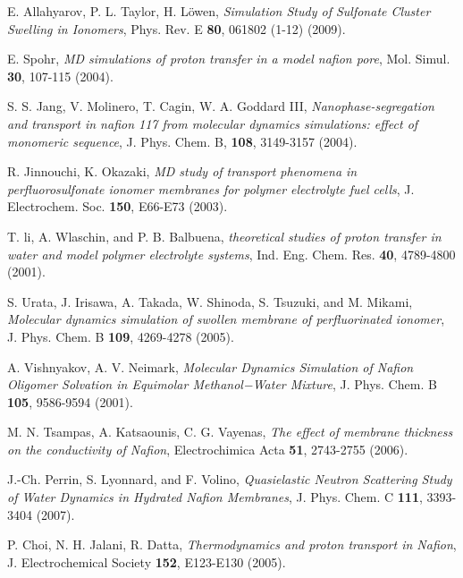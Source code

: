 \documentclass[3p,english,preprint]{elsarticle}
\newcommand{\need}[1]{\textcolor{black}{#1}}
\begin{document}
\begin{thebibliography}{00}
E. Allahyarov, P.  L. Taylor, H. L{\"o}wen,
{\it Simulation Study of Sulfonate Cluster Swelling in Ionomers},
 Phys. Rev. E {\bf 80}, 061802 (1-12) (2009).


E. Spohr,
{\it MD simulations of proton transfer in a model nafion pore},
 Mol. Simul. {\bf 30},  107-115  (2004).


S. S. Jang, V. Molinero, T. Cagin, W. A. Goddard III,
{\it Nanophase-segregation and transport in nafion 117 from molecular
dynamics simulations: effect of monomeric sequence},
J. Phys. Chem. B, {\textbf{108}}, 3149-3157  (2004).



R. Jinnouchi, K. Okazaki,
{\it MD study of transport phenomena in perfluorosulfonate ionomer
membranes for polymer electrolyte fuel cells}, 
J. Electrochem. Soc. {\bf 150}, E66-E73  (2003). 

T. li, A. Wlaschin, and P. B. Balbuena,
{\it theoretical studies of proton transfer in water and model polymer electrolyte systems}, 
Ind. Eng. Chem. Res. {\bf 40}, 4789-4800 (2001).



S. Urata, J. Irisawa, A. Takada, W. Shinoda, S. Tsuzuki, and M. Mikami, 
{\it Molecular dynamics simulation of swollen membrane of perfluorinated ionomer}, 
J. Phys. Chem.  B {\bf 109}, 4269-4278 (2005).  %


  A. Vishnyakov, A. V. Neimark,
{\it Molecular Dynamics Simulation of Nafion Oligomer Solvation in Equimolar Methanol−Water Mixture},
  J. Phys. Chem. B  {\bf 105},  9586-9594 (2001). 

 M. N. Tsampas,  A. Katsaounis, C. G. Vayenas,
{\it The effect of membrane thickness on the conductivity of Nafion},
Electrochimica Acta {\bf 51}, 2743-2755 (2006).



J.-Ch. Perrin, S. Lyonnard, and F. Volino, 
{\it Quasielastic Neutron Scattering Study of Water Dynamics in Hydrated Nafion Membranes},
J. Phys. Chem. C {\bf 111}, 3393-3404 (2007).

 P. Choi, N. H. Jalani, R. Datta, 
{\it Thermodynamics and proton transport in Nafion}, 
J. Electrochemical Society {\bf 152},  E123-E130 (2005).



\end{thebibliography}
\end{document}
